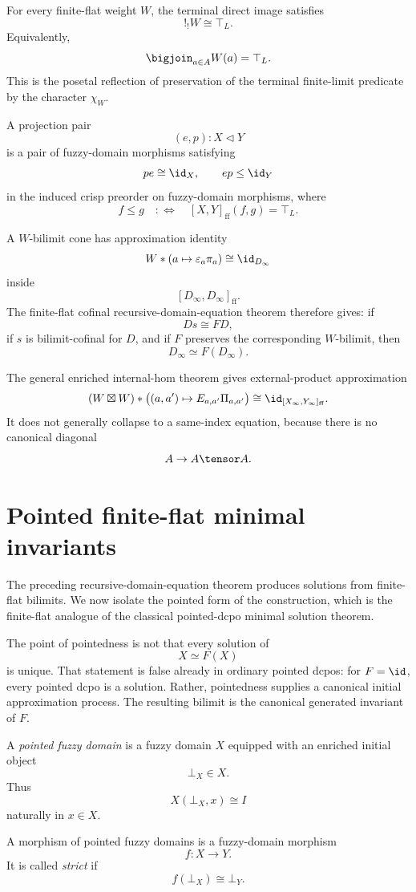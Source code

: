 For every finite-flat weight \(W\), the terminal direct image satisfies
\[
    !_!W\cong \top_L.
\]
Equivalently,
\[
    \bigjoin_{a\in A}W(a)=\top_L.
\]
This is the posetal reflection of preservation of the terminal finite-limit
predicate by the character \(\chi_W\).

A projection pair
\[
    (e,p):X\triangleleft Y
\]
is a pair of fuzzy-domain morphisms satisfying
\[
    pe\cong \id_X,
    \qquad
    ep\leq \id_Y
\]
in the induced crisp preorder on fuzzy-domain morphisms, where
\[
    f\leq g
    \quad:\Longleftrightarrow\quad
    [X,Y]_{\mathrm{ff}}(f,g)=\top_L.
\]

A \(W\)-bilimit cone has approximation identity
\[
    W*(a\mapsto \varepsilon_a\pi_a)
    \cong
    \id_{D_\infty}
\]
inside
\[
    [D_\infty,D_\infty]_{\mathrm{ff}}.
\]
The finite-flat cofinal recursive-domain-equation theorem therefore gives:
if
\[
    Ds\cong FD,
\]
if \(s\) is bilimit-cofinal for \(D\), and if \(F\) preserves the corresponding
\(W\)-bilimit, then
\[
    D_\infty\simeq F(D_\infty).
\]

The general enriched internal-hom theorem gives external-product approximation
\[
    (W\boxtimes W)*
    \bigl((a,a')\mapsto E_{a,a'}\Pi_{a,a'}\bigr)
    \cong
    \id_{[X_\infty,Y_\infty]_{\mathrm{ff}}}.
\]
It does not generally collapse to a same-index equation, because there is no
canonical diagonal
\[
    A\to A\tensor A.
\]

\section{Pointed finite-flat minimal invariants}
\label{sec:pointed-ff-minimal-invariants}

The preceding recursive-domain-equation theorem produces solutions from
finite-flat bilimits.  We now isolate the pointed form of the construction,
which is the finite-flat analogue of the classical pointed-dcpo minimal
solution theorem.

The point of pointedness is not that every solution of
\[
    X\simeq F(X)
\]
is unique.  That statement is false already in ordinary pointed dcpos: for
\(F=\id\), every pointed dcpo is a solution.  Rather, pointedness supplies a
canonical initial approximation process.  The resulting bilimit is the
canonical generated invariant of \(F\).

\begin{definition}
\label{def:pointed-fuzzy-domain}
A \emph{pointed fuzzy domain} is a fuzzy domain \(X\) equipped with an enriched
initial object
\[
    \bot_X\in X.
\]
Thus
\[
    X(\bot_X,x)\cong I
\]
naturally in \(x\in X\).

A morphism of pointed fuzzy domains is a fuzzy-domain morphism
\[
    f:X\to Y.
\]
It is called \emph{strict} if
\[
    f(\bot_X)\cong \bot_Y.
\]
\end{definition}

